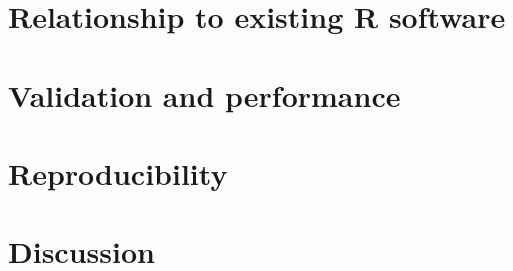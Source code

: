 \documentclass{jss}
\begin{document}

\section{Relationship to existing R software}


\section{Validation and performance}


\section{Reproducibility}


\section{Discussion}



\end{document}
